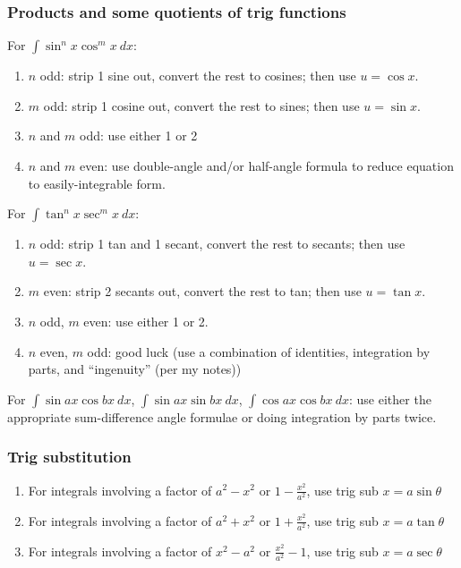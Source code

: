 \documentclass[main.tex]{subfiles}
\begin{document}
	\subsubsection*{Products and some quotients of trig functions}
	For \(\displaystyle \int \sin^n{x} \cos^m{x} \ dx\):
	\begin{enumerate}
	\item \(n\) odd: strip 1 sine out, convert the rest to cosines; then use \(u = \cos{x}\).
	\item \(m\) odd: strip 1 cosine out, convert the rest to sines; then use \(u = \sin{x}\).
	\item \(n\) and \(m\) odd: use either 1 or 2
	\item \(n\) and \(m\) even: use double-angle and/or half-angle formula to reduce equation to easily-integrable form.
	\end{enumerate}

	For \(\displaystyle \int \tan^n{x} \sec^m{x} \ dx\):
	\begin{enumerate}
	\item \(n\) odd: strip 1 tan and 1 secant, convert the rest to secants; then use \(u = \sec{x}\).
	\item \(m\) even: strip 2 secants out, convert the rest to tan; then use \(u = \tan{x}\).
	\item \(n\) odd, \(m\) even: use either 1 or 2.
	\item \(n\) even, \(m\) odd: good luck (use a combination of identities, integration by parts, and ``ingenuity'' (per my notes))
	\end{enumerate}

	For \(\displaystyle \int \sin{ax} \cos{bx} \ dx\), \(\displaystyle \int \sin{ax} \sin{bx} \ dx\), \(\displaystyle \int \cos{ax} \cos{bx} \ dx\): use either the appropriate sum-difference angle formulae or doing integration by parts twice.

	\subsubsection*{Trig substitution}
	\begin{enumerate}
		\item For integrals involving a factor of \(a^2 - x^2\) or \(1 - \frac{x^2}{a^2}\), use trig sub \(x = a \sin{\theta}\)
		\item For integrals involving a factor of \(a^2 + x^2\) or \(1 + \frac{x^2}{a^2}\), use trig sub \(x = a \tan{\theta}\)
		\item For integrals involving a factor of \(x^2 - a^2\) or \(\frac{x^2}{a^2} - 1\), use trig sub \(x = a \sec{\theta}\)
	\end{enumerate}
	
\end{document}

